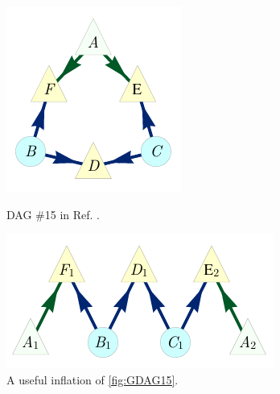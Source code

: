\begin{figure}[b]
\centering
\begin{minipage}[t]{0.4\linewidth}
\centering
\includegraphics[scale=1]{scen15DAGV2.pdf}
\caption{DAG \#15 in Ref. \cite{pusey2014gdag}.}\label{fig:GDAG15}
\end{minipage}
\hfill
\begin{minipage}[t]{0.5\linewidth}
\centering
\includegraphics[scale=1]{scen15InflationDAGV2.pdf}
\caption{A useful inflation of \cref{fig:GDAG15}.}\label{fig:Inflated15}
\end{minipage}
\end{figure}

